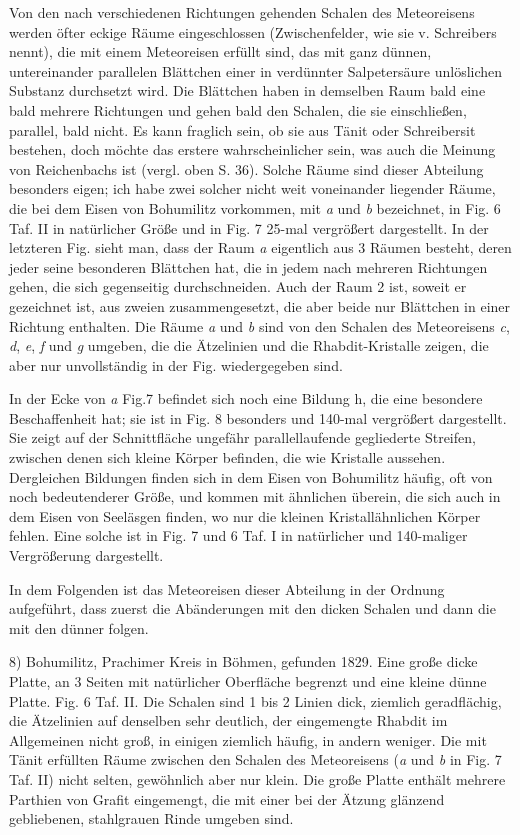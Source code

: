 \documentclass[a4paper, 11pt, oneside]{article}
\begin{document}
Von den nach verschiedenen Richtungen gehenden Schalen des Meteoreisens werden öfter eckige Räume eingeschlossen (Zwischenfelder, wie sie v. Schreibers nennt), die mit einem Meteoreisen erfüllt sind, das mit ganz dünnen, untereinander parallelen Blättchen einer in verdünnter Salpetersäure unlöslichen Substanz durchsetzt wird. Die Blättchen haben in demselben Raum bald eine bald mehrere Richtungen und gehen bald den Schalen, die sie einschließen, parallel, bald nicht. Es kann fraglich sein, ob sie aus Tänit oder Schreibersit bestehen, doch möchte das erstere wahrscheinlicher sein, was auch die Meinung von Reichenbachs ist (vergl. oben S. 36). Solche Räume sind dieser Abteilung besonders eigen; ich habe zwei solcher nicht weit voneinander liegender Räume, die bei dem Eisen von Bohumilitz vorkommen, mit \emph{a} und \emph{b} bezeichnet, in Fig. 6 Taf. II in natürlicher Größe und in Fig. 7 25-mal vergrößert dargestellt. In der letzteren Fig. sieht man, dass der Raum \emph{a} eigentlich aus 3 Räumen besteht, deren jeder seine besonderen Blättchen hat, die in jedem nach mehreren Richtungen gehen, die sich gegenseitig durchschneiden. Auch der Raum 2 ist, soweit er gezeichnet ist, aus zweien zusammengesetzt, die aber beide nur Blättchen in einer Richtung enthalten. Die Räume \emph{a} und \emph{b} sind von den Schalen des Meteoreisens \emph{c}, \emph{d}, \emph{e}, \emph{f} und \emph{g} umgeben, die die Ätzelinien und die Rhabdit-Kristalle zeigen, die aber nur unvollständig in der Fig. wiedergegeben sind.

In der Ecke von \emph{a} Fig.7 befindet sich noch eine Bildung h, die eine besondere Beschaffenheit hat; sie ist in Fig. 8 besonders und 140-mal vergrößert dargestellt. Sie zeigt auf der Schnittfläche ungefähr parallellaufende gegliederte Streifen, zwischen denen sich kleine Körper befinden, die wie Kristalle aussehen. Dergleichen Bildungen finden sich in dem Eisen von Bohumilitz häufig, oft von noch bedeutenderer Größe, und kommen mit ähnlichen überein, die sich auch in dem Eisen von Seeläsgen finden, wo nur die kleinen Kristallähnlichen Körper fehlen. Eine solche ist in Fig. 7 und 6 Taf. I in natürlicher und 140-maliger Vergrößerung dargestellt.

In dem Folgenden ist das Meteoreisen dieser Abteilung in der Ordnung aufgeführt, dass zuerst die Abänderungen mit den dicken Schalen und dann die mit den dünner folgen.

8) Bohumilitz, Prachimer Kreis in Böhmen, gefunden 1829. Eine große dicke Platte, an 3 Seiten mit natürlicher Oberfläche begrenzt und eine kleine dünne Platte. Fig. 6 Taf. II. Die Schalen sind 1 bis 2 Linien dick, ziemlich geradflächig, die Ätzelinien auf denselben sehr deutlich, der eingemengte Rhabdit im Allgemeinen nicht groß, in einigen ziemlich häufig, in andern weniger. Die mit Tänit erfüllten Räume zwischen den Schalen des Meteoreisens (\emph{a} und \emph{b} in Fig. 7 Taf. II) nicht selten, gewöhnlich aber nur klein. Die große Platte enthält mehrere Parthien von Grafit eingemengt, die mit einer bei der Ätzung glänzend gebliebenen, stahlgrauen Rinde umgeben sind.
\end{document}
